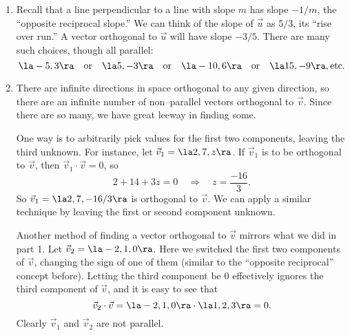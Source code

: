 
{\begin{enumerate}
	\item Recall that a line perpendicular to a line with slope $m$ has slope $-1/m$, the ``opposite reciprocal slope.'' We can think of the slope of $\vec u$ as $5/3$, its ``rise over run.'' A vector orthogonal to $\vec u$ will have slope $-3/5$. There are many such choices, though all parallel:
	$$\la -5,3\ra \quad \text{or} \quad\la 5,-3\ra \quad \text{or} \quad \la -10,6\ra\quad \text{or} \quad \la 15,-9\ra,\text{etc.}$$
	\item		There are infinite directions in space orthogonal to any given direction, so there are an infinite number of non--parallel vectors orthogonal to $\vec v$. Since there are so many, we have great leeway in finding some.
	
	One way is to arbitrarily pick values for the first two components, leaving the third unknown. For instance, let $\vec v_1 = \la 2,7,z\ra$. If $\vec v_1$ is to be orthogonal to $\vec v$, then $\vec v_1\cdot\vec v = 0$, so 
	$$2+14+3z=0 \quad \Rightarrow \quad z = \frac{-16}{3}.$$
	So $\vec v_1 = \la 2, 7, -16/3\ra$ is orthogonal to $\vec v$. We can apply a similar technique by leaving the first or second component unknown.
	
	Another method of finding a vector orthogonal to $\vec v$ mirrors what we did in part 1. Let $\vec v_2 = \la-2,1,0\ra$. Here we switched the first two components of $\vec v$, changing the sign of one of them (similar to the ``opposite reciprocal'' concept before). Letting the third component be 0 effectively ignores the third component of $\vec v$, and it is easy to see that 
	$$\vec v_2\cdot\vec v = \la -2,1,0\ra\cdot\la 1,2,3\ra = 0.$$
	Clearly $\vec v_1$ and $\vec v_2$ are not parallel.
\end{enumerate}}

